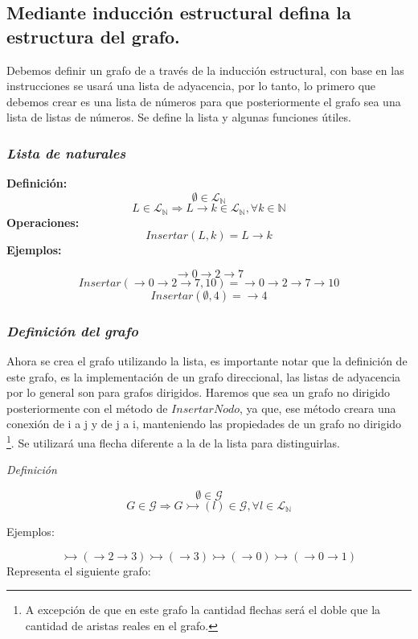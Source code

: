 \documentclass[../doc.tex]{subfiles}
\begin{document}
\subsection{Mediante inducción estructural defina la estructura del grafo.}

Debemos definir un grafo de a través de la inducción estructural, con base en 
las instrucciones se usará una lista de adyacencia, por lo tanto, lo primero que
debemos crear es una lista de números para que posteriormente el grafo sea una 
lista de listas de números. Se define la lista y algunas funciones útiles.

\subsubsection*{\emph{Lista de naturales}}
\textbf{Definición:}
\[ \emptyset \in \mathcal{L}_{\mathbb{N}} \]
\[ L \in \mathcal{L}_\mathbb{N} \Rightarrow L \rightarrow k \in \mathcal{L}_\mathbb{N}, \forall k \in \mathbb{N}\]
\textbf{Operaciones:}
\[ Insertar(L, k) = L \rightarrow k\]
\newline
\textbf{Ejemplos:}

\[ \rightarrow 0 \rightarrow 2 \rightarrow 7 \]
\[ Insertar(\rightarrow 0 \rightarrow 2 \rightarrow 7, 10) =  \rightarrow 0 \rightarrow 2 \rightarrow 7 \rightarrow 10\]
\[ Insertar(\emptyset, 4) = \rightarrow 4 \]

\subsubsection*{\emph{Definición del grafo}}
Ahora se crea el grafo utilizando la lista, es importante notar que la definición 
de este grafo, es la implementación de un grafo direccional, las listas 
de adyacencia por lo general son para grafos dirigidos. Haremos que sea un grafo
no dirigido posteriormente con el método de $InsertarNodo$, ya que, ese método creara 
una conexión de i a j y de j a i, manteniendo las propiedades de un grafo no dirigido
\footnote{A excepción de que en este grafo la cantidad flechas será el doble que la 
cantidad de aristas reales en el grafo.}. Se utilizará una flecha diferente a la 
de la lista para distinguirlas.

\emph{Definición}

\[ \emptyset \in \mathcal{G} \]
\[ G \in \mathcal{G} \Rightarrow G \rightarrowtail (l) \in \mathcal{G} , \forall l \in \mathcal{L}_\mathbb{N} \]

Ejemplos:

\[ \rightarrowtail ( \rightarrow 2 \rightarrow 3) \rightarrowtail (\rightarrow 3) \rightarrowtail (\rightarrow 0) \rightarrowtail (\rightarrow 0 \rightarrow 1) \]
Representa el siguiente grafo: 
\end{document}
